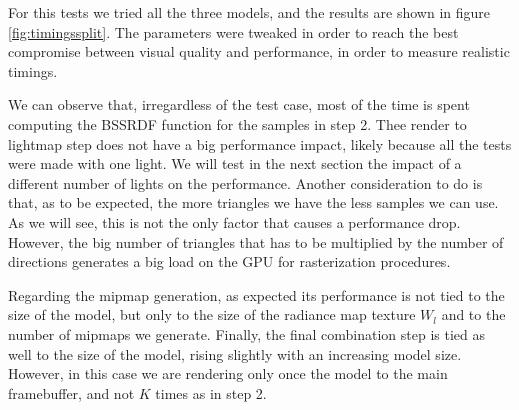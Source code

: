 For this tests we tried all the three models, and the results are shown in figure \ref{fig:timingssplit}. The parameters were tweaked in order to reach the best compromise between visual quality and performance, in order to measure realistic timings. 

We can observe that, irregardless of the test case, most of the time is spent computing the BSSRDF function for the samples in step 2. Thee render to lightmap step does not have a big performance impact, likely because all the tests were made with one light. We will test in the next section the impact of a different number of lights on the performance.  Another consideration to do is that, as to be expected, the more triangles we have the less samples we can use. As we will see, this is not the only factor that causes a performance drop. However, the big number of triangles that has to be multiplied by the number of directions generates a big load on the GPU for rasterization procedures. 

Regarding the mipmap generation, as expected its performance is not tied to the size of the model, but only to the size of the radiance map texture $W_l$ and to the number of mipmaps we generate. Finally, the final combination step is tied as well to the size of the model, rising slightly with an increasing model size. However, in this case we are rendering only once the model to the main framebuffer, and not $K$ times as in step 2.

